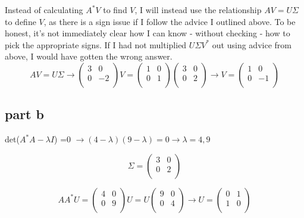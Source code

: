 \documentclass[a4paper,12pt]{article}
\begin{document}
Instead of calculating $A^*V$ to find $V$, I will instead use the relationship $AV=U\Sigma$ to define $V$, as there is a sign issue if I follow the advice I outlined above. To be honest, it's not immediately clear how I can know - without checking - how to pick the appropriate signs. If I had not multiplied $U\Sigma V^*$ out using advice from above, I would have gotten the wrong answer. 
\begin{equation}
AV=U\Sigma \rightarrow \begin{pmatrix}
3&0	\\
0&-2\\ 
\end{pmatrix} V= 
\begin{pmatrix}
1&0	\\
0&1\\ 
\end{pmatrix} 
\begin{pmatrix}
3&0	\\
0&2\\ 
\end{pmatrix} \rightarrow V= \begin{pmatrix}
1&0	\\
0&-1\\ 
\end{pmatrix}
\end{equation}



\subsection{part b}
det($A^*A - \lambda I$) =0 $\rightarrow (4-\lambda)(9-\lambda)=0 \rightarrow \lambda=4,9$ 
 
\begin{equation}
\Sigma =\begin{pmatrix}
3&0	\\
0&2\\ 
\end{pmatrix}
\end{equation}

\begin{equation}
AA^*U=\begin{pmatrix}
4&0	\\
0&9\\ 
\end{pmatrix}  U = U\begin{pmatrix}
9&0	\\
0&4\\ 
\end{pmatrix} \rightarrow U=\begin{pmatrix}
0&1	\\
1&0\\ 
\end{pmatrix}
\end{equation}
\end{document}
